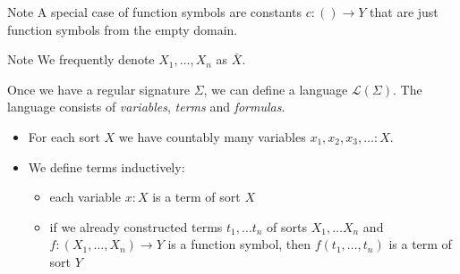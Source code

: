 \documentclass[14pt]{beamer}
\theoremstyle{plain}
\begin{document}
  \begin{frame}
    \begin{block}{Note}
      A special case of function symbols are constants $c : () \to Y$ that are just
      function symbols from the empty domain.
    \end{block}
    \pause 
    \begin{block}{Note}
      We frequently denote $X_1, \ldots, X_n$ as $\bar{X}$.
    \end{block}
  \end{frame}

  \begin{frame}
    Once we have a regular signature $\Sigma$, we can define a language $\mathcal{L}(\Sigma)$.
    \pause
    The language consists of \emph{variables}, \emph{terms} and \emph{formulas}.
    \pause
    \begin{itemize}
      \pause
      \item For each sort $X$ we have countably many variables $x_1, x_2, x_3, \ldots : X$.
      \vspace{1em}
      \pause
      \item We define terms inductively:
        \begin{itemize}
          \vspace{1em}
          \pause
          \item each variable $x : X$ is a term of sort $X$
          \vspace{1em}
          \pause
          \item if we already constructed terms $t_1, \ldots t_n$ of sorts $X_1, \ldots X_n$
            and $f : (X_1, \ldots, X_n) \to Y$ is a function symbol, then $f(t_1, \ldots, t_n)$
            is a term of sort $Y$
        \end{itemize}
    \end{itemize}
  \end{frame}
\end{document}
